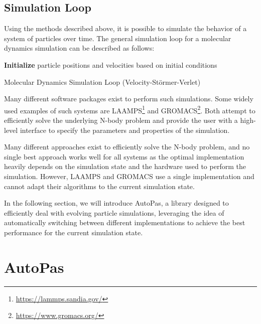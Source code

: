 \subsection{Simulation Loop}

Using the methods described above, it is possible to simulate the behavior of a system of particles over time. The general simulation loop for a molecular dynamics simulation can be described as follows:


\begin{algorithm}
      \SetAlgoLined
      \textbf{Initialize} particle positions and velocities based on initial conditions\;
      \vspace{0.2cm}
      \caption{Molecular Dynamics Simulation Loop (Velocity-Störmer-Verlet)}
\end{algorithm}


Many different software packages exist to perform such simulations. Some widely used examples of such systems are LAAMPS\footnote{\url{https://lammps.sandia.gov/}} and GROMACS\footnote{\url{https://www.gromacs.org/}}. Both attempt to efficiently solve the underlying N-body problem and provide the user with a high-level interface to specify the parameters and properties of the simulation.

Many different approaches exist to efficiently solve the N-body problem, and no single best approach works well for all systems as the optimal implementation heavily depends on the simulation state and the hardware used to perform the simulation. However, LAAMPS and GROMACS use a single implementation and cannot adapt their algorithms to the current simulation state.

In the following section, we will introduce AutoPas, a library designed to efficiently deal with evolving particle simulations, leveraging the idea of automatically switching between different implementations to achieve the best performance for the current simulation state.

\section{AutoPas}

